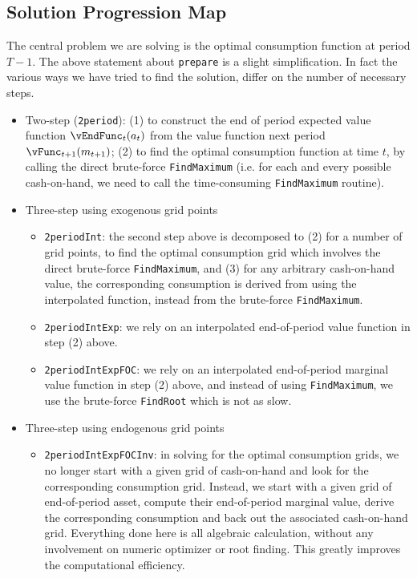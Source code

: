 \documentclass[titlepage,abstract]{\econtex}
\begin{document}
\subsection{Solution Progression Map}
The central problem we are solving is the optimal consumption function at period $T-1$. The above statement about \texttt{prepare} is a slight simplification. In fact the various ways we have tried to find the solution, differ on the number of necessary steps.

\begin{itemize}
\item Two-step (\texttt{2period}): (1) to construct the end of period expected value function $\vEndFunc_{t}(a_{t})$ from the value function next period $\vFunc_{t+1}(m_{t+1})$; (2) to find the optimal consumption function at time $t$, by calling the direct brute-force \texttt{FindMaximum} (i.e. for each and every possible cash-on-hand, we need to call the time-consuming \texttt{FindMaximum} routine).
\item Three-step using exogenous grid points
    \begin{itemize}
    \item \texttt{2periodInt}: the second step above is decomposed to (2) for a number of grid points, to find the optimal consumption grid which involves the direct brute-force \texttt{FindMaximum}, and (3) for any arbitrary cash-on-hand value, the corresponding consumption is derived from using the interpolated function, instead from the brute-force \texttt{FindMaximum}.
    \item \texttt{2periodIntExp}: we rely on an interpolated end-of-period value function in step (2) above.
    \item \texttt{2periodIntExpFOC}: we rely on an interpolated end-of-period marginal value function in step (2) above, and instead of using \texttt{FindMaximum}, we use the brute-force \texttt{FindRoot} which is not as slow.
    \end{itemize}
\item Three-step using endogenous grid points
    \begin{itemize}
    \item \texttt{2periodIntExpFOCInv}: in solving for the optimal consumption grids, we no longer start with a given grid of cash-on-hand and look for the corresponding consumption grid. Instead, we start with a given grid of end-of-period asset, compute their end-of-period marginal value, derive the corresponding consumption and back out the associated cash-on-hand grid. Everything done here is all algebraic calculation, without any involvement on numeric optimizer or root finding. This greatly improves the computational efficiency.

\end{itemize}
\end{itemize}
\end{document}
